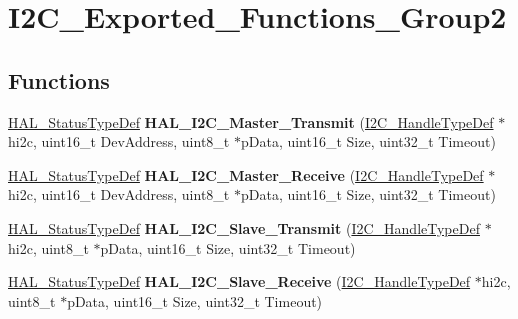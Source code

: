 \hypertarget{group___i2_c___exported___functions___group2}{}\section{I2\+C\+\_\+\+Exported\+\_\+\+Functions\+\_\+\+Group2}
\label{group___i2_c___exported___functions___group2}
\subsection*{Functions}
\begin{DoxyCompactItemize}
\item 
\hyperlink{stm32f4xx__hal__def_8h_a63c0679d1cb8b8c684fbb0632743478f}{H\+A\+L\+\_\+\+Status\+Type\+Def} {\bfseries H\+A\+L\+\_\+\+I2\+C\+\_\+\+Master\+\_\+\+Transmit} (\hyperlink{struct_i2_c___handle_type_def}{I2\+C\+\_\+\+Handle\+Type\+Def} $\ast$hi2c, uint16\+\_\+t Dev\+Address, uint8\+\_\+t $\ast$p\+Data, uint16\+\_\+t Size, uint32\+\_\+t Timeout)\hypertarget{group___i2_c___exported___functions___group2_ga9440a306e25c7bd038cfa8619ec9a830}{}\label{group___i2_c___exported___functions___group2_ga9440a306e25c7bd038cfa8619ec9a830}

\item 
\hyperlink{stm32f4xx__hal__def_8h_a63c0679d1cb8b8c684fbb0632743478f}{H\+A\+L\+\_\+\+Status\+Type\+Def} {\bfseries H\+A\+L\+\_\+\+I2\+C\+\_\+\+Master\+\_\+\+Receive} (\hyperlink{struct_i2_c___handle_type_def}{I2\+C\+\_\+\+Handle\+Type\+Def} $\ast$hi2c, uint16\+\_\+t Dev\+Address, uint8\+\_\+t $\ast$p\+Data, uint16\+\_\+t Size, uint32\+\_\+t Timeout)\hypertarget{group___i2_c___exported___functions___group2_ga6b3cef8c309e88ed6d3b8deba149aac9}{}\label{group___i2_c___exported___functions___group2_ga6b3cef8c309e88ed6d3b8deba149aac9}

\item 
\hyperlink{stm32f4xx__hal__def_8h_a63c0679d1cb8b8c684fbb0632743478f}{H\+A\+L\+\_\+\+Status\+Type\+Def} {\bfseries H\+A\+L\+\_\+\+I2\+C\+\_\+\+Slave\+\_\+\+Transmit} (\hyperlink{struct_i2_c___handle_type_def}{I2\+C\+\_\+\+Handle\+Type\+Def} $\ast$hi2c, uint8\+\_\+t $\ast$p\+Data, uint16\+\_\+t Size, uint32\+\_\+t Timeout)\hypertarget{group___i2_c___exported___functions___group2_ga9128c5f01406d0da061a2bce00b6866e}{}\label{group___i2_c___exported___functions___group2_ga9128c5f01406d0da061a2bce00b6866e}

\item 
\hyperlink{stm32f4xx__hal__def_8h_a63c0679d1cb8b8c684fbb0632743478f}{H\+A\+L\+\_\+\+Status\+Type\+Def} {\bfseries H\+A\+L\+\_\+\+I2\+C\+\_\+\+Slave\+\_\+\+Receive} (\hyperlink{struct_i2_c___handle_type_def}{I2\+C\+\_\+\+Handle\+Type\+Def} $\ast$hi2c, uint8\+\_\+t $\ast$p\+Data, uint16\+\_\+t Size, uint32\+\_\+t Timeout)\hypertarget{group___i2_c___exported___functions___group2_ga92b445a5ca4f5b8195f1c10ebdc41687}{}\label{group___i2_c___exported___functions___group2_ga92b445a5ca4f5b8195f1c10ebdc41687}


\end{DoxyCompactItemize}
